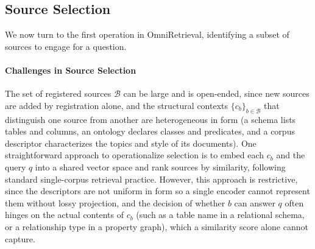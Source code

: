 \subsection{Source Selection}

We now turn to the first operation in OmniRetrieval, identifying a subset of sources to engage for a question.

\paragraph{Challenges in Source Selection}
The set of registered sources $\mathcal{B}$ can be large and is open-ended, since new sources are added by registration alone, and the structural contexts $\{c_b\}_{b \in \mathcal{B}}$ that distinguish one source from another are heterogeneous in form (a schema lists tables and columns, an ontology declares classes and predicates, and a corpus descriptor characterizes the topics and style of its documents). One straightforward approach to operationalize selection is to embed each $c_b$ and the query $q$ into a shared vector space and rank sources by similarity, following standard single-corpus retrieval practice. However, this approach is restrictive, since the descriptors are not uniform in form so a single encoder cannot represent them without lossy projection, and the decision of whether $b$ can answer $q$ often hinges on the actual contents of $c_b$ (such as a table name in a relational schema, or a relationship type in a property graph), which a similarity score alone cannot capture.

